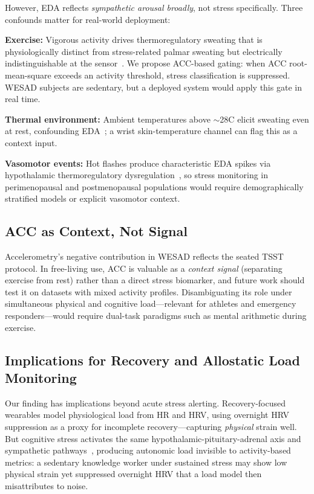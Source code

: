 \documentclass[10pt,twocolumn]{article}
\begin{document}
However, EDA reflects \emph{sympathetic arousal broadly}, not stress
specifically. Three confounds matter for real-world deployment:

\textbf{Exercise:} Vigorous activity drives thermoregulatory sweating that is
physiologically distinct from stress-related palmar sweating but electrically
indistinguishable at the sensor~\cite{kellogg1994exercise}. We propose
ACC-based gating: when ACC root-mean-square exceeds an activity threshold,
stress classification is suppressed. WESAD subjects are sedentary, but a
deployed system would apply this gate in real time.

\textbf{Thermal environment:} Ambient temperatures above $\sim$28\textdegree C
elicit sweating even at rest, confounding EDA~\cite{romanovsky2014thermoreg};
a wrist skin-temperature channel can flag this as a context input.

\textbf{Vasomotor events:} Hot flashes produce characteristic EDA spikes via
hypothalamic thermoregulatory dysregulation~\cite{freedman2014hotflash}, so
stress monitoring in perimenopausal and postmenopausal populations would
require demographically stratified models or explicit vasomotor context.

\subsection{ACC as Context, Not Signal}

Accelerometry's negative contribution in WESAD reflects the seated TSST
protocol. In free-living use, ACC is valuable as a \emph{context signal}
(separating exercise from rest) rather than a direct stress biomarker, and
future work should test it on datasets with mixed activity profiles.
Disambiguating its role under simultaneous physical and cognitive load---relevant
for athletes and emergency responders---would require dual-task paradigms such
as mental arithmetic during exercise.

\subsection{Implications for Recovery and Allostatic Load Monitoring}

Our finding has implications beyond acute stress alerting. Recovery-focused
wearables model physiological load from HR and HRV, using overnight HRV
suppression as a proxy for incomplete recovery---capturing \emph{physical}
strain well. But cognitive stress activates the same
hypothalamic-pituitary-adrenal axis and sympathetic pathways~\cite{kim2018hrv},
producing autonomic load invisible to activity-based metrics: a sedentary
knowledge worker under sustained stress may show low physical strain yet
suppressed overnight HRV that a load model then misattributes to noise.
\end{document}
